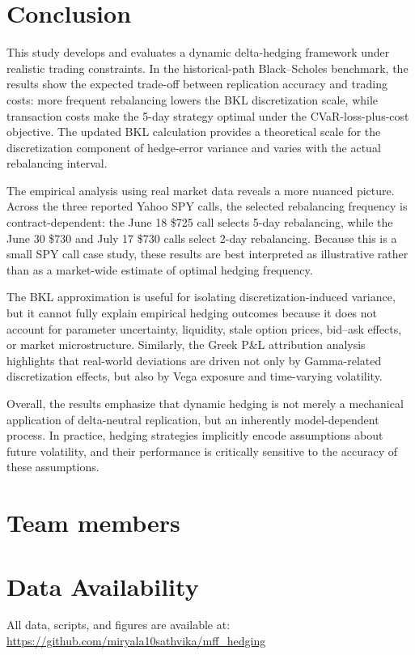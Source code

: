 \documentclass{article}
\begin{document}
\section{Conclusion}

This study develops and evaluates a dynamic delta-hedging framework under realistic trading constraints. In the historical-path Black--Scholes benchmark, the results show the expected trade-off between replication accuracy and trading costs: more frequent rebalancing lowers the BKL discretization scale, while transaction costs make the 5-day strategy optimal under the CVaR-loss-plus-cost objective. The updated BKL calculation provides a theoretical scale for the discretization component of hedge-error variance and varies with the actual rebalancing interval.

The empirical analysis using real market data reveals a more nuanced picture. Across the three reported Yahoo SPY calls, the selected rebalancing frequency is contract-dependent: the June 18 \$725 call selects 5-day rebalancing, while the June 30 \$730 and July 17 \$730 calls select 2-day rebalancing. Because this is a small SPY call case study, these results are best interpreted as illustrative rather than as a market-wide estimate of optimal hedging frequency.

The BKL approximation is useful for isolating discretization-induced variance, but it cannot fully explain empirical hedging outcomes because it does not account for parameter uncertainty, liquidity, stale option prices, bid--ask effects, or market microstructure. Similarly, the Greek P\&L attribution analysis highlights that real-world deviations are driven not only by Gamma-related discretization effects, but also by Vega exposure and time-varying volatility.

Overall, the results emphasize that dynamic hedging is not merely a mechanical application of delta-neutral replication, but an inherently model-dependent process. In practice, hedging strategies implicitly encode assumptions about future volatility, and their performance is critically sensitive to the accuracy of these assumptions.
\section{Team members}
\section{Data Availability}
All data, scripts, and figures are available at: \url{https://github.com/miryala10sathvika/mff_hedging}
\end{document}
